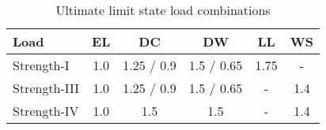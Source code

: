 \begin{table}[H]
\caption{Ultimate limit state load combinations}
\centering
\begin{tabular}{lccccc}
\hline
Load         & EL  & DC         & DW         & LL   & WS  \\ \hline
Strength-I   & 1.0 & 1.25 / 0.9 & 1.5 / 0.65 & 1.75 & -   \\
Strength-III & 1.0 & 1.25 / 0.9 & 1.5 / 0.65 & -    & 1.4 \\ 
Strength-IV  & 1.0 & 1.5        & 1.5        & -    & 1.4 \\ \hline
\end{tabular}
\end{table}